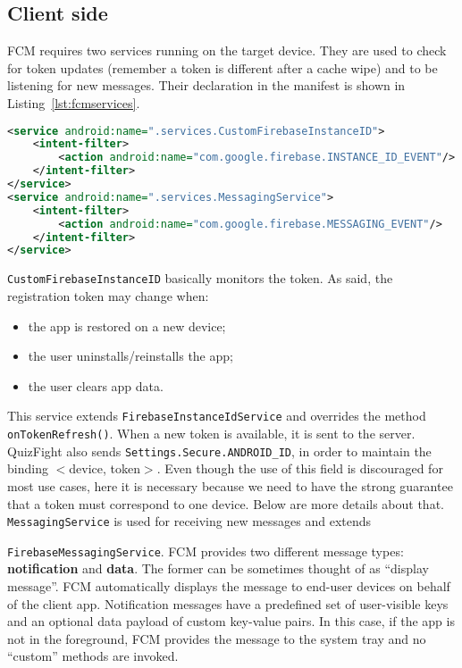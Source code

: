 \subsection{Client side}
FCM requires two services running on the target device.
They are used to check for token updates (remember a token is different after
a cache wipe) and to be listening for new messages.
Their declaration in the manifest is shown in Listing~\ref{lst:fcmservices}.

\begin{lstlisting}[language=xml, caption={FCM Services}, label={lst:fcmservices}]
<service android:name=".services.CustomFirebaseInstanceID">
	<intent-filter>
		<action android:name="com.google.firebase.INSTANCE_ID_EVENT"/>
	</intent-filter>
</service>
<service android:name=".services.MessagingService">
	<intent-filter>
		<action android:name="com.google.firebase.MESSAGING_EVENT"/>
	</intent-filter>
</service>
\end{lstlisting}

\texttt{CustomFirebaseInstanceID} basically monitors the token.
As said, the registration token may change when:

\begin{itemize}
	\item the app is restored on a new device;
	\item the user uninstalls/reinstalls the app;
	\item the user clears app data.
\end{itemize}

This service extends \texttt{FirebaseInstanceIdService} and overrides the
method \texttt{onTokenRefresh()}.
When a new token is available, it is sent to the server.
QuizFight also sends \texttt{Settings.Secure.ANDROID\_ID}, in order to
maintain the binding $<$device, token$>$. Even though the use of this field is
discouraged for most use cases, here it is necessary because we need to have
the strong guarantee that a token must correspond to one device.
Below are more details about that. \\

\texttt{MessagingService} is used for receiving new messages and extends 

\texttt{FirebaseMessagingService}. FCM provides two different message types:
\textbf{notification} and \textbf{data}.
The former can be sometimes thought of as ``display message''.
FCM automatically displays the message to end-user devices on behalf of the
client app.
Notification messages have a predefined set of user-visible keys and an
optional data payload of custom key-value pairs.
In this case, if the app is not in the foreground, FCM provides the message to
the system tray and no ``custom'' methods are invoked.

